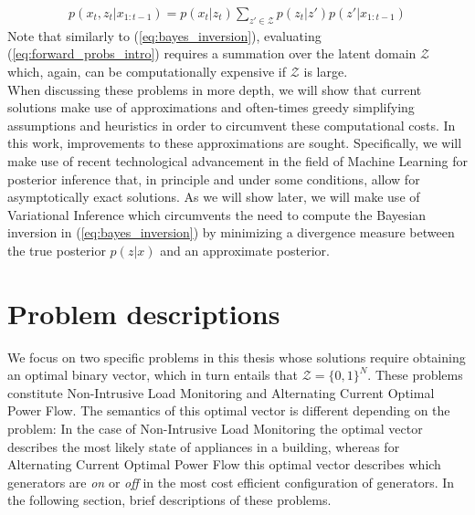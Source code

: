 \documentclass[11pt]{cmuthesis} %
\begin{document}
 \begin{align}
     p(x_t, z_t | x_{1:t-1}) = p(x_t|z_t) \sum_{z' \in \mathcal{Z}} p(z_t| z') p(z'|x_{1:t-1}) \label{eq:forward_probs_intro}
 \end{align}
 Note that similarly to (\ref{eq:bayes_inversion}), evaluating (\ref{eq:forward_probs_intro}) requires a summation over the latent domain $\mathcal{Z}$ which, again, can be computationally expensive if $\mathcal{Z}$ is large.\\
 
 When discussing these problems in more depth, we will show that current solutions make use of approximations and often-times greedy simplifying assumptions and heuristics in order to circumvent these computational costs. In this work, improvements to these approximations are sought. Specifically, we will make use of recent technological advancement in the field of Machine Learning for posterior inference that, in principle and under some conditions, allow for asymptotically exact solutions. As we will show later, we will make use of Variational Inference which circumvents the need to compute the Bayesian inversion in (\ref{eq:bayes_inversion}) by minimizing a divergence measure between the true posterior $p(z|x)$ and an approximate posterior.

\section{Problem descriptions}
We focus on two specific problems in this thesis whose solutions require obtaining an optimal binary vector, which in turn entails that $\mathcal{Z} = \{0,1\}^N$. These problems constitute Non-Intrusive Load Monitoring and Alternating Current Optimal Power Flow. The semantics of this optimal vector is different depending on the problem: In the case of Non-Intrusive Load Monitoring the optimal vector describes the most likely state of appliances in a building, whereas for Alternating Current Optimal Power Flow this optimal vector describes which generators are \emph{on} or \emph{off} in the most cost efficient configuration of generators. In the following section, brief descriptions of these problems.
\end{document}
